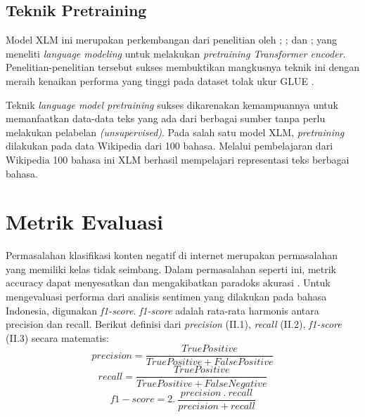     \subsection{Teknik Pretraining}
    Model XLM ini merupakan perkembangan dari penelitian oleh \parencite{radford2018improving}; \parencite{HowardRuder2018}; dan \parencite{Devlin_Chang_Lee_Toutanova_2019}; yang meneliti \textit{language modeling} untuk melakukan \textit{pretraining Transformer encoder}. Penelitian-penelitian tersebut sukses membuktikan mangkusnya teknik ini dengan meraih kenaikan performa yang tinggi pada dataset tolak ukur GLUE \parencite{GLUE2019}.

    Teknik \textit{language model pretraining} sukses dikarenakan kemampuannya untuk memanfaatkan data-data teks yang ada dari berbagai sumber tanpa perlu melakukan pelabelan \textit{(unsupervised)}. Pada salah satu model XLM, \textit{pretraining} dilakukan pada data Wikipedia dari 100 bahasa. Melalui pembelajaran dari Wikipedia 100 bahasa ini XLM berhasil mempelajari representasi teks berbagai bahasa.

\section{Metrik Evaluasi}
Permasalahan klasifikasi konten negatif di internet merupakan permasalahan yang memiliki kelas tidak seimbang. Dalam permasalahan seperti ini, metrik accuracy dapat menyesatkan dan mengakibatkan paradoks akurasi \parencite{Zhu_Davidson_2007}. Untuk mengevaluasi performa dari analisis sentimen yang dilakukan pada bahasa Indonesia, digunakan \textit{f1-score}. \textit{f1-score} adalah rata-rata harmonis antara precision dan recall. Berikut definisi dari \textit{precision} (II.1),  \textit{recall} (II.2),  \textit{f1-score} (II.3)  secara matematis:
\begin{equation}
    precision=\frac{True Positive}{True Positive + False Positive}
\end{equation}
\begin{equation}
    recall=\frac{True Positive}{True Positive + False Negative}
\end{equation}
\begin{equation}
    f1-score=2.\: \frac{precision\: .\: recall}{precision+recall}
\end{equation}

